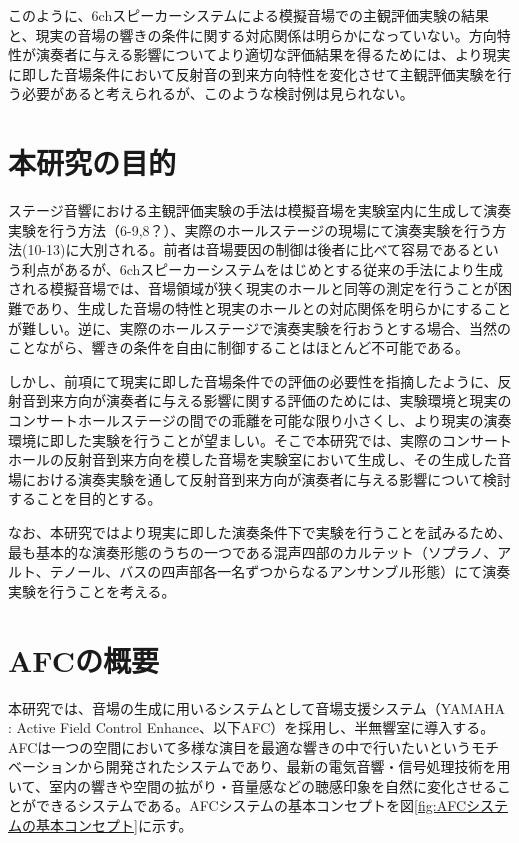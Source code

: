 \documentclass[11pt,a4j]{jreport}
\begin{document}
このように、6chスピーカーシステムによる模擬音場での主観評価実験の結果と、現実の音場の響きの条件に関する対応関係は明らかになっていない。方向特性が演奏者に与える影響についてより適切な評価結果を得るためには、より現実に即した音場条件において反射音の到来方向特性を変化させて主観評価実験を行う必要があると考えられるが、このような検討例は見られない。



\newpage
\section{本研究の目的} %
ステージ音響における主観評価実験の手法は模擬音場を実験室内に生成して演奏実験を行う方法（6-9,8？）、実際のホールステージの現場にて演奏実験を行う方法(10-13)に大別される。前者は音場要因の制御は後者に比べて容易であるという利点があるが、6chスピーカーシステムをはじめとする従来の手法により生成される模擬音場では、音場領域が狭く現実のホールと同等の測定を行うことが困難であり、生成した音場の特性と現実のホールとの対応関係を明らかにすることが難しい。逆に、実際のホールステージで演奏実験を行おうとする場合、当然のことながら、響きの条件を自由に制御することはほとんど不可能である。

しかし、前項にて現実に即した音場条件での評価の必要性を指摘したように、反射音到来方向が演奏者に与える影響に関する評価のためには、実験環境と現実のコンサートホールステージの間での乖離を可能な限り小さくし、より現実の演奏環境に即した実験を行うことが望ましい。そこで本研究では、実際のコンサートホールの反射音到来方向を模した音場を実験室において生成し、その生成した音場における演奏実験を通して反射音到来方向が演奏者に与える影響について検討することを目的とする。

なお、本研究ではより現実に即した演奏条件下で実験を行うことを試みるため、最も基本的な演奏形態のうちの一つである混声四部のカルテット（ソプラノ、アルト、テノール、バスの四声部各一名ずつからなるアンサンブル形態）にて演奏実験を行うことを考える。


\section{AFCの概要} %

本研究では、音場の生成に用いるシステムとして音場支援システム（YAMAHA : Active Field Control Enhance、以下AFC）を採用し、半無響室に導入する。AFCは一つの空間において多様な演目を最適な響きの中で行いたいというモチベーションから開発されたシステムであり、最新の電気音響・信号処理技術を用いて、室内の響きや空間の拡がり・音量感などの聴感印象を自然に変化させることができるシステムである\cite{AFC}。AFCシステムの基本コンセプトを図\ref{fig:AFCシステムの基本コンセプト}に示す。
\end{document}
